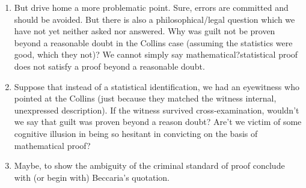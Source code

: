 \documentclass[16pt]{article}
\begin{document}
\begin{enumerate}
\begin{enumerate}
 \end{enumerate}
\item But drive home a more problematic point. Sure, errors are committed and should be avoided. But there is also a philosophical/legal question which we have not yet neither asked nor answered. Why was guilt not be proven beyond a reasonable doubt in the Collins case (assuming the statistics were good, which they not)? We cannot simply say  mathematical?statistical proof does not satisfy a proof beyond a reasonable doubt. 

\item Suppose that instead of a statistical identification, we had an eyewitness who pointed at the Collins (just because they matched the witness internal, unexpressed description). If the witness survived cross-examination, wouldn't we say that guilt was proven beyond a reason doubt? Are't we victim of some cognitive illusion in being so hesitant in convicting on the basis of mathematical proof?

\item Maybe, to show the ambiguity of the criminal standard of proof conclude with (or begin with) Beccaria's quotation.
\end{enumerate}
\end{document}
